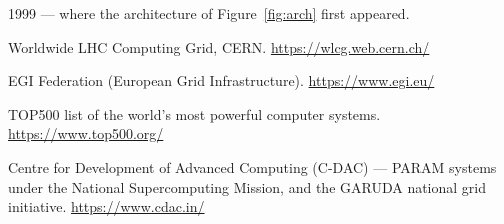 \begin{enumerate}[label={[\arabic*]},ref=\arabic*,leftmargin=2.2em]
        1999 --- where the architecture of Figure~\ref{fig:arch} first
        appeared.
  \item\label{ref:wlcg} Worldwide LHC Computing Grid, CERN.
        \url{https://wlcg.web.cern.ch/}
  \item\label{ref:egi} EGI Federation (European Grid Infrastructure).
        \url{https://www.egi.eu/}
  \item\label{ref:top500} TOP500 list of the world's most powerful computer
        systems. \url{https://www.top500.org/}
  \item\label{ref:cdac} Centre for Development of Advanced Computing (C-DAC)
        --- PARAM systems under the National Supercomputing Mission, and the
        GARUDA national grid initiative. \url{https://www.cdac.in/}
\end{enumerate}